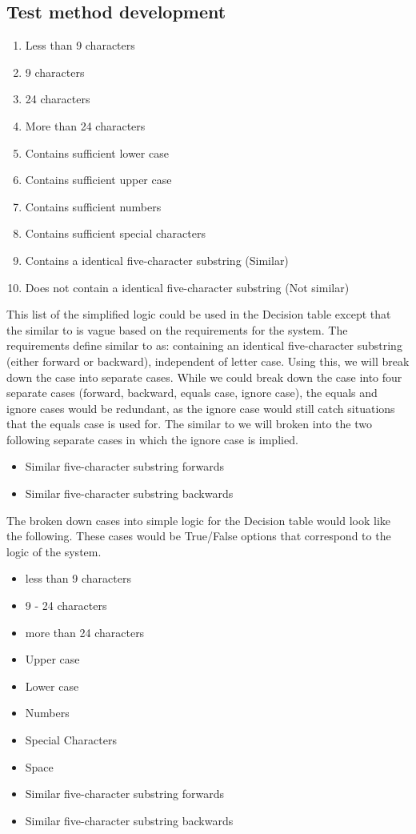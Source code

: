 \documentclass[12pt,letterpaper]{article}
\begin{document}
\subsection{Test method development}

\begin{enumerate}
\item Less than 9 characters
\item 9 characters
\item 24 characters
\item More than 24 characters
\item Contains sufficient lower case
\item Contains sufficient upper case
\item Contains sufficient numbers
\item Contains sufficient special characters
\item Contains a identical five-character substring (Similar)
\item Does not contain a identical five-character substring (Not similar)
\end{enumerate}

This list of the simplified logic could be used in the Decision table except that the similar to is vague based on the
requirements for the system. The requirements define similar to as: containing an identical five-character
substring (either forward or backward), independent of letter case.
Using this, we will break down the case into separate cases. While we could break down the case into
four separate cases (forward, backward, equals case, ignore case), the equals and
ignore cases would be redundant, as the ignore case would still catch situations that the equals
case is used for. The similar to we will broken into the two following separate cases in which the ignore case is implied.

\begin{itemize}
\item Similar five-character substring forwards
\item Similar five-character substring backwards
\end{itemize}

The broken down cases into simple logic for the Decision table would look like the following.
These cases would be True/False options that correspond to the logic of the system.

\begin{itemize}
\item less than 9 characters
\item 9 - 24 characters
\item more than 24 characters
\item Upper case
\item Lower case
\item Numbers
\item Special Characters
\item Space
\item Similar five-character substring forwards
\item Similar five-character substring backwards
\end{itemize}
\end{document}
